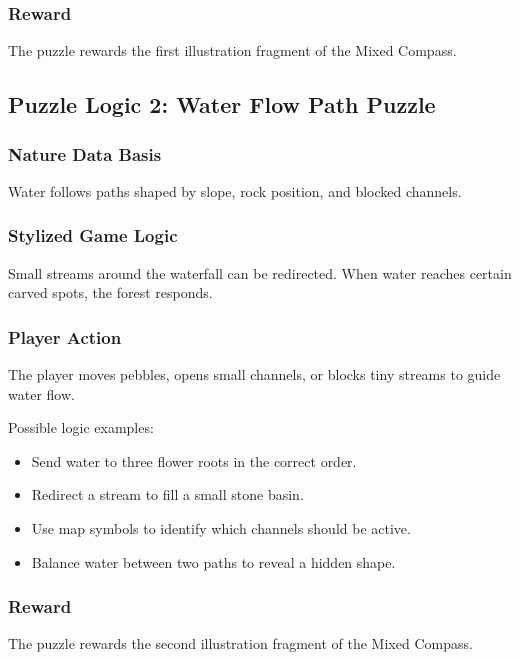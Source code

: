 \documentclass[12pt]{article}
\begin{document}
\subsubsection{Reward}

The puzzle rewards the first illustration fragment of the Mixed Compass.

\subsection{Puzzle Logic 2: Water Flow Path Puzzle}

\subsubsection{Nature Data Basis}

Water follows paths shaped by slope, rock position, and blocked channels.

\subsubsection{Stylized Game Logic}

Small streams around the waterfall can be redirected. When water reaches certain carved spots, the forest responds.

\subsubsection{Player Action}

The player moves pebbles, opens small channels, or blocks tiny streams to guide water flow.

Possible logic examples:

\begin{itemize}[leftmargin=*]
    \item Send water to three flower roots in the correct order.
    \item Redirect a stream to fill a small stone basin.
    \item Use map symbols to identify which channels should be active.
    \item Balance water between two paths to reveal a hidden shape.
\end{itemize}

\subsubsection{Reward}

The puzzle rewards the second illustration fragment of the Mixed Compass.
\end{document}
